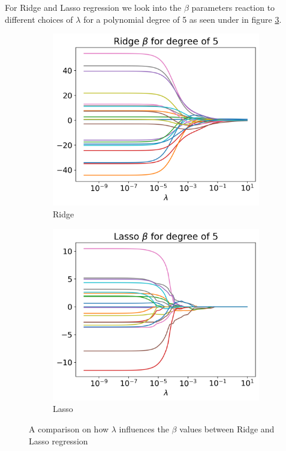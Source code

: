 \documentclass[12pt]{article}
\begin{document}
For Ridge and Lasso regression we look into the $\beta$ parameters reaction to different choices of $\lambda$ for a polynomial degree of 5 as seen under in figure \ref{fig:beta_lambda_rl}.
\begin{figure}[H]
  \begin{subfigure}{.5\textwidth}
    \centering
    \includegraphics[width=\textwidth]{../figures/ridge_beta.png}
    \caption{Ridge}
    \label{fig:}
  \end{subfigure}
  \begin{subfigure}{.5\textwidth}
    \centering
    \includegraphics[width=\textwidth]{../figures/lasso_beta.png}
    \caption{Lasso}
    \label{fig:}
  \end{subfigure}
  \caption{A comparison on how $\lambda$ influences the $\beta$ values between Ridge and Lasso regression}
  \label{fig:beta_lambda_rl}
\end{figure}
\end{document}
